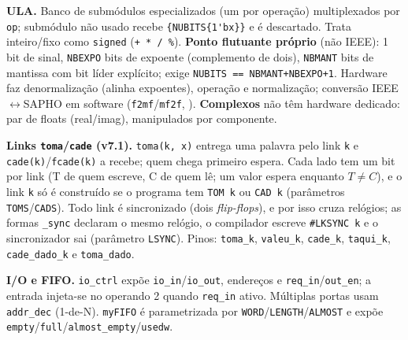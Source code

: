 \textbf{ULA.} Banco de submódulos especializados (um por operação) multiplexados por \lstinline|op|; submódulo não usado recebe \lstinline|{NUBITS{1'bx}}| e é descartado. Trata inteiro/fixo como \lstinline|signed| (\lstinline|+ * / %|). \textbf{Ponto flutuante próprio} (não IEEE): 1 bit de sinal, \lstinline|NBEXPO| bits de expoente (complemento de dois), \lstinline|NBMANT| bits de mantissa com bit líder explícito; exige \lstinline|NUBITS == NBMANT+NBEXPO+1|. Hardware faz denormalização (alinha expoentes), operação e normalização; conversão IEEE$\leftrightarrow$SAPHO em software (\lstinline|f2mf|/\lstinline|mf2f|, ). \textbf{Complexos} não têm hardware dedicado: par de floats (real/imag), manipulados por componente.

\textbf{Links \texttt{toma}/\texttt{cade} (v7.1).} \lstinline|toma(k, x)| entrega uma palavra pelo link \lstinline|k| e \lstinline|cade(k)|/\lstinline|fcade(k)| a recebe; quem chega primeiro espera. Cada lado tem um bit por link (T de quem escreve, C de quem lê; um valor espera enquanto $T \neq C$), e o link \lstinline|k| só é construído se o programa tem \lstinline|TOM k| ou \lstinline|CAD k| (parâmetros \lstinline|TOMS|/\lstinline|CADS|). Todo link é sincronizado (dois \emph{flip-flops}), e por isso cruza relógios; as formas \lstinline|_sync| declaram o mesmo relógio, o compilador escreve \lstinline|#LKSYNC k| e o sincronizador sai (parâmetro \lstinline|LSYNC|). Pinos: \lstinline|toma_k|, \lstinline|valeu_k|, \lstinline|cade_k|, \lstinline|taqui_k|, \lstinline|cade_dado_k| e \lstinline|toma_dado|.

\textbf{I/O e FIFO.} \lstinline|io_ctrl| expõe \lstinline|io_in|/\lstinline|io_out|, endereços e \lstinline|req_in|/\lstinline|out_en|; a entrada injeta-se no operando 2 quando \lstinline|req_in| ativo. Múltiplas portas usam \lstinline|addr_dec| (1-de-N). \lstinline|myFIFO| é parametrizada por \lstinline|WORD|/\lstinline|LENGTH|/\lstinline|ALMOST| e expõe \lstinline|empty|/\lstinline|full|/\lstinline|almost_empty|/\lstinline|usedw|.

